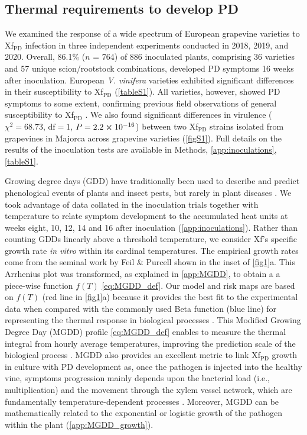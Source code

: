 \subsection{Thermal requirements to develop PD} We examined the response of a
wide spectrum of European grapevine varieties to Xf$_{\textrm{PD}}$ infection
in three independent experiments conducted in 2018, 2019, and 2020. Overall,
86.1\% ($n$ = 764) of 886 inoculated plants, comprising 36 varieties and 57
unique scion/rootstock combinations, developed PD symptoms 16 weeks after
inoculation. European \textit{V. vinifera} varieties exhibited significant
differences in their susceptibility to Xf$_{\textrm{PD}}$ (\cref{tableS1}). All
varieties, however, showed PD symptoms to some extent, confirming
previous field observations of general susceptibility to Xf$_{\textrm{PD}}$
\cite{Hopkins2002, Moralejo2019, Purcell2013}.	We also found significant
differences in virulence ($\chi^2=68.73$, $\textrm{df}=1$, $P=2.2 \cross
    10^{-16}$) between two Xf$_{\textrm{PD}}$ strains isolated from grapevines
in Majorca across grapevine varieties (\cref{figS1}). Full details on the
results of the inoculation tests are available in Methods,
\cref{app:inoculations}, \cref{tableS1}.

Growing degree days (GDD) have traditionally been used to describe and predict
phenological events of plants and insect pests, but rarely in plant diseases
\cite{McMaster1997}. We took advantage of data collated in the inoculation
trials together with temperature to relate symptom development to the
accumulated heat units at weeks eight, 10, 12, 14 and 16 after inoculation
(\cref{app:inoculations}).  Rather than counting GDDs linearly above a
threshold temperature, we consider Xf's specific growth rate \textit{in vitro}
within its cardinal temperatures. The empirical growth rates come from the
seminal work by Feil \& Purcell \cite{Feil2001} shown in the inset of
\cref{fig1}a. This Arrhenius plot was transformed, as explained in
\cref{app:MGDD}, to obtain a a piece-wise function $f(T)$
\cref{eq:MGDD_def}. Our model and risk maps are based on $f(T)$ (red line in
\cref{fig1}a) because it provides the best fit to the experimental data when
compared with the commonly used Beta function (blue line) for representing the
thermal response in biological processes \cite{Yan1999,Magarey2005}. This
Modified Growing Degree Day (MGDD) profile \cref{eq:MGDD_def} enables to
measure the thermal integral from hourly average temperatures, improving the
prediction scale of the biological process \cite{butikofer2020problem}. MGDD
also provides an excellent metric to link Xf$_{\textrm{PD}}$ growth in culture
with PD development as, once the pathogen is injected into the healthy vine,
symptoms progression mainly depends upon the bacterial load (i.e.,
multiplication) and the movement through the xylem vessel network, which are
fundamentally temperature-dependent processes
\cite{fry1990multiplication,Feil2001}. Moreover, MGDD can be mathematically
related to the exponential or logistic growth of the pathogen within the plant
(\cref{app:MGDD_growth}).

